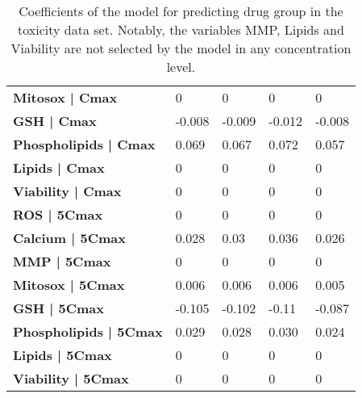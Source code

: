 \begin{table}[hbtp]
{\begin{tabular}{lllll}
\textbf{Mitosox | Cmax}          & 0                                  & 0                                  & 0               & 0               \\
\textbf{GSH | Cmax}              & -0.008                             & -0.009                             & -0.012          & -0.008          \\
\textbf{Phospholipids | Cmax}    & 0.069                              & 0.067                              & 0.072           & 0.057           \\
\textbf{Lipids | Cmax}           & 0                                  & 0                                  & 0               & 0               \\
\textbf{Viability | Cmax}        & 0                                  & 0                                  & 0               & 0               \\
\textbf{ROS | 5Cmax}             & 0                                  & 0                                  & 0               & 0               \\
\textbf{Calcium | 5Cmax}         & 0.028                              & 0.03                               & 0.036           & 0.026           \\
\textbf{MMP | 5Cmax}             & 0                                  & 0                                  & 0               & 0               \\
\textbf{Mitosox | 5Cmax}         & 0.006                              & 0.006                              & 0.006           & 0.005           \\
\textbf{GSH | 5Cmax}             & -0.105                             & -0.102                             & -0.11           & -0.087          \\
\textbf{Phospholipids | 5Cmax}   & 0.029                              & 0.028                              & 0.030           & 0.024           \\
\textbf{Lipids | 5Cmax}          & 0                                  & 0                                  & 0               & 0               \\
\textbf{Viability | 5Cmax}       & 0                                  & 0                                  & 0               & 0               \\ \hline
\end{tabular}}
\caption[Coefficients of the model for predicting drug group in the toxicity data set]{Coefficients of the model for predicting drug group in the toxicity data set. Notably, the variables MMP, Lipids and Viability are not selected by the model in any concentration level.}
\label{table:toxicity_results}
\end{table}

